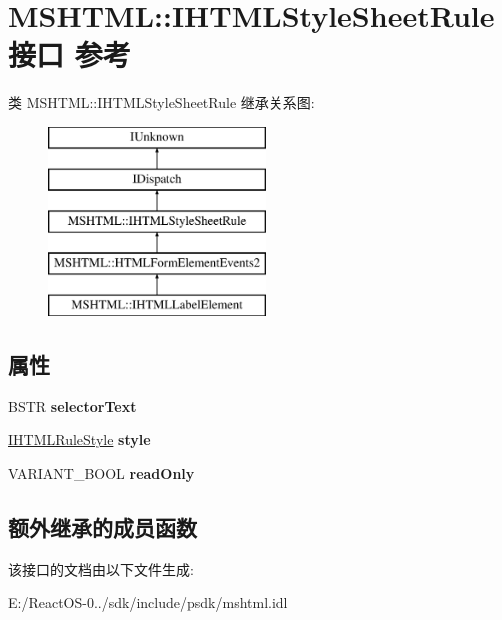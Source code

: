 \hypertarget{interface_m_s_h_t_m_l_1_1_i_h_t_m_l_style_sheet_rule}{}\section{M\+S\+H\+T\+ML\+:\+:I\+H\+T\+M\+L\+Style\+Sheet\+Rule接口 参考}
\label{interface_m_s_h_t_m_l_1_1_i_h_t_m_l_style_sheet_rule}
类 M\+S\+H\+T\+ML\+:\+:I\+H\+T\+M\+L\+Style\+Sheet\+Rule 继承关系图\+:\begin{figure}[H]
\begin{center}
\leavevmode
\includegraphics[height=5.000000cm]{interface_m_s_h_t_m_l_1_1_i_h_t_m_l_style_sheet_rule}
\end{center}
\end{figure}
\subsection*{属性}
\begin{DoxyCompactItemize}
\item 
\mbox{\label{interface_m_s_h_t_m_l_1_1_i_h_t_m_l_style_sheet_rule_a4ca8d4084a7ea9f94f37a99667d99540}} 
B\+S\+TR {\bfseries selector\+Text}
\item 
\mbox{\label{interface_m_s_h_t_m_l_1_1_i_h_t_m_l_style_sheet_rule_a027222fcfafe7e3c2e13e66c65e19a94}} 
\hyperlink{interface_m_s_h_t_m_l_1_1_i_h_t_m_l_rule_style}{I\+H\+T\+M\+L\+Rule\+Style} {\bfseries style}
\item 
\mbox{\label{interface_m_s_h_t_m_l_1_1_i_h_t_m_l_style_sheet_rule_a6aaadfd62891b156b68ff95b57220dec}} 
V\+A\+R\+I\+A\+N\+T\+\_\+\+B\+O\+OL {\bfseries read\+Only}
\end{DoxyCompactItemize}
\subsection*{额外继承的成员函数}


该接口的文档由以下文件生成\+:\begin{DoxyCompactItemize}
\item 
E\+:/\+React\+O\+S-\/0../sdk/include/psdk/mshtml.\+idl\end{DoxyCompactItemize}
